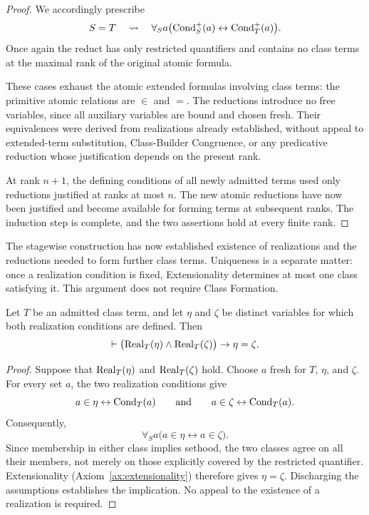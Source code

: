 \begin{proof}
We accordingly prescribe
\[
S=T
\quad\rightsquigarrow\quad
\forall_S a\bigl(\operatorname{Cond}_S^{+}(a)\leftrightarrow \operatorname{Cond}_T^{+}(a)\bigr).
\]
Once again the reduct has only restricted quantifiers and contains
no class terms at the maximal rank of the original atomic formula.

These cases exhaust the atomic extended formulas involving class
terms: the primitive atomic relations are \(\in\) and \(=\).
The reductions introduce no free variables, since all auxiliary
variables are bound and chosen fresh. Their equivalences were
derived from realizations already established, without appeal to
extended-term substitution, Class-Builder Congruence, or any
predicative reduction whose justification depends on the present
rank.

At rank \(n+1\), the defining conditions of all newly admitted
terms used only reductions justified at ranks at most \(n\). The
new atomic reductions have now been justified and become available
for forming terms at subsequent ranks. The induction step is
complete, and the two assertions hold at every finite rank.
\end{proof}

The stagewise construction has now established existence of
realizations and the reductions needed to form further class terms.
Uniqueness is a separate matter: once a realization condition is
fixed, Extensionality determines at most one class satisfying it.
This argument does not require Class Formation.

\begin{metatheorem}
\label{meta:uniqueness-of-class-term-realizations}
Let \(T\) be an admitted class term, and let \(\eta\) and \(\zeta\)
be distinct variables for which both realization conditions are
defined. Then
\[
\vdash
\bigl(\operatorname{Real}_T(\eta)\land\operatorname{Real}_T(\zeta)\bigr)
\to\eta=\zeta.
\]
\end{metatheorem}

\begin{proof}
Suppose that \(\operatorname{Real}_T(\eta)\) and \(\operatorname{Real}_T(\zeta)\) hold.
Choose \(a\) fresh for \(T\), \(\eta\), and \(\zeta\).
For every set \(a\), the two realization conditions give
\[
a\in\eta\leftrightarrow\operatorname{Cond}_T(a)
\qquad\text{and}\qquad
a\in\zeta\leftrightarrow\operatorname{Cond}_T(a).
\]
Consequently,
\[
\forall_S a\bigl(a\in\eta\leftrightarrow a\in\zeta\bigr).
\]
Since membership in either class implies sethood, the two classes
agree on all their members, not merely on those explicitly covered
by the restricted quantifier. Extensionality
(Axiom~\ref{ax:extensionality}) therefore gives \(\eta=\zeta\).
Discharging the assumptions establishes the implication.
No appeal to the existence of a realization is required.
\end{proof}

